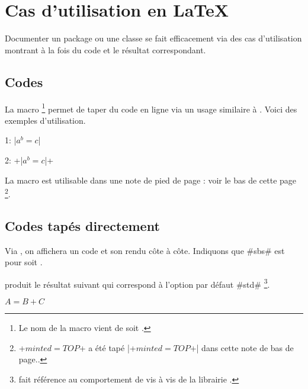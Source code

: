 \documentclass[10pt, a4paper]{article}
\begin{document}
\section{Cas d'utilisation en \LaTeX}

Documenter un package ou une classe se fait efficacement via des cas d'utilisation montrant à la fois du code et le résultat correspondant.




\subsection{Codes } \label{tdoc-listing-inline}

La macro 
\footnote{
	Le nom de la macro  vient de  soit .
}
permet de taper du code en ligne via un usage similaire à .
Voici des exemples d'utilisation.


\begin{tdoclatex}[sbs]
    1: \tdocinlatex|$a^b = c$|
    
    2: \tdocinlatex+\tdocinlatex|$a^b = c$|+
\end{tdoclatex}


\begin{tdocnote}
    La macro  est utilisable dans une note de pied de page : voir le bas de cette page
    \footnote{
        \tdocinlatex+$minted = TOP$+ a été tapé \tdocinlatex|\tdocinlatex+$minted = TOP$+| dans cette note de bas de page..
    }.
\end{tdocnote}




\subsection{Codes tapés directement}

\begin{tdocexa}
    Via , on affichera un code et son rendu côte à côte.
    Indiquons que \tdocinlatex#sbs# est pour  soit .
\end{tdocexa}




\begin{tdocexa}[À la suite]
     produit le résultat suivant qui correspond à l'option par défaut \tdocinlatex#std#
    \footnote{
         fait référence au comportement  de  vis à vis de la librairie .
    }.

    \begin{tdoclatex}
        $A = B + C$
    \end{tdoclatex}
\end{tdocexa}
\end{document}
